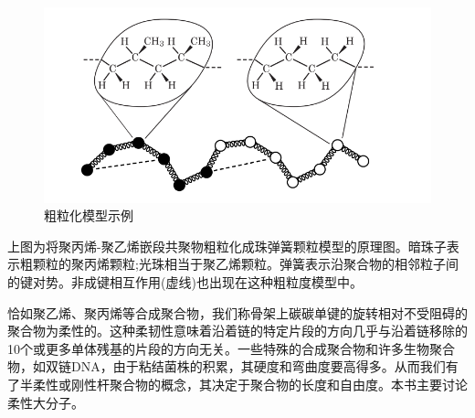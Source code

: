 \begin{figure}[h]
\centering
\includegraphics[scale=0.5
]{Contents/chapter1/figures/1-3.png}
\caption{粗粒化模型示例}
\end{figure}

上图为将聚丙烯-聚乙烯嵌段共聚物粗粒化成珠弹簧颗粒模型的原理图。暗珠子表示粗颗粒的聚丙烯颗粒;光珠相当于聚乙烯颗粒。弹簧表示沿聚合物的相邻粒子间的键对势。非成键相互作用(虚线)也出现在这种粗粒度模型中。

恰如聚乙烯、聚丙烯等合成聚合物，我们称骨架上碳碳单键的旋转相对不受阻碍的聚合物为柔性的。这种柔韧性意味着沿着链的特定片段的方向几乎与沿着链移除的10个或更多单体残基的片段的方向无关。一些特殊的合成聚合物和许多生物聚合物，如双链DNA，由于粘结菌株的积累，其硬度和弯曲度要高得多。从而我们有了半柔性或刚性杆聚合物的概念，其决定于聚合物的长度和自由度。本书主要讨论柔性大分子。
